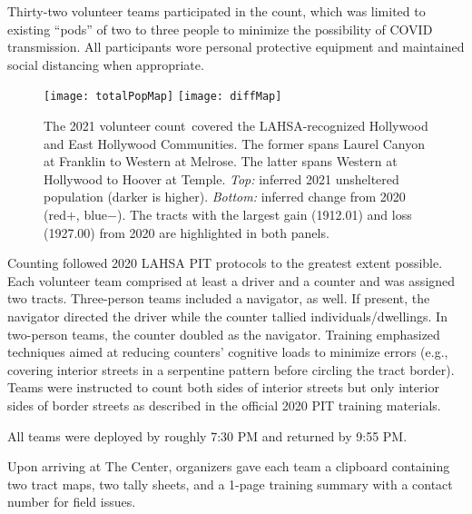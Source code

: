 \documentclass[11pt,twocolumn]{article}
\def\Count{count}
\begin{document}
Thirty-two volunteer teams participated in the \Count, which was limited to existing ``pods'' of two 
to three people to minimize the possibility of COVID transmission. 
All participants wore 
personal protective equipment and maintained social distancing when appropriate.

\begin{figure}[t!]
	\centering
	\texttt{[image: totalPopMap]}
	\texttt{[image: diffMap]}
	\caption{The 2021 volunteer \Count\ covered the LAHSA-recognized Hollywood and East 
			Hollywood Communities. The former spans Laurel Canyon at Franklin to Western
			at Melrose. The latter spans Western at Hollywood to Hoover at Temple. 
			{\it Top:} inferred 2021 unsheltered population (darker is higher). 
			{\it Bottom:} inferred change from 2020 (red$+$, blue$-$). The tracts with the 
			largest gain (1912.01) and loss (1927.00) from 2020 are highlighted
			in both panels.}
	\label{fig:map}	
\end{figure}

Counting followed 2020 LAHSA PIT protocols to the greatest extent possible. Each volunteer team 
comprised at least a driver and a counter and was assigned two tracts. Three-person teams 
included a navigator, as well. If present, the navigator directed the driver while the counter tallied 
individuals/dwellings. In two-person teams, the counter doubled as the navigator. Training 
emphasized techniques aimed at reducing counters' cognitive loads to minimize errors (e.g., 
covering interior streets in a serpentine pattern before circling the tract border). Teams were 
instructed to count both sides of interior streets but only interior sides of border streets 
as described in the official 2020 PIT training materials.

All teams were deployed by roughly 7:30 PM and returned by 9:55 PM.

Upon arriving at The Center, organizers gave each team a clipboard containing two tract maps,
two tally sheets, and a 1-page training summary with a contact number for field issues.
\end{document}
